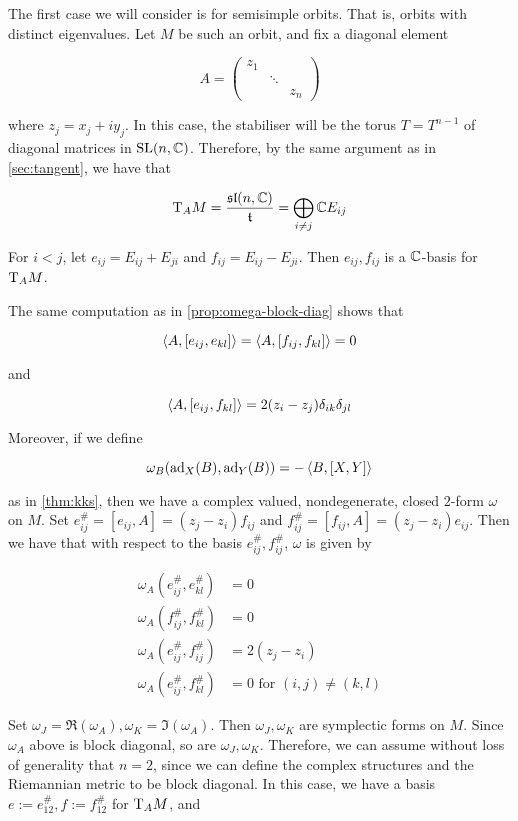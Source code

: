\documentclass{article}
\renewcommand{\sl}{\mathfrak{sl}}
\begin{document}
The first case we will consider is for semisimple orbits. That is, orbits with distinct eigenvalues. Let \(M\) be such an orbit, and fix a diagonal element

\[A = \begin{pmatrix}
    z_1 \\
    & \ddots \\
    & & z_n
\end{pmatrix}\]

where \(z_j = x_j + iy_j\). In this case, the stabiliser will be the torus \(T = T^{n-1}\) of diagonal matrices in \(\operatorname{SL}(n, \mathbb{C})\). Therefore, by the same argument as in \cref{sec:tangent}, we have that

\[\T_AM = \frac{\sl(n, \C)}{\mft} = \bigoplus_{i \ne j}\C E_{ij}\]

For \(i < j\), let \(e_{ij} = E_{ij} + E_{ji}\) and \(f_{ij} = E_{ij} - E_{ji}\). Then \(e_{ij}, f_{ij}\) is a \(\mathbb{C}\)-basis for \(\mathrm{T}_A M\).

The same computation as in \cref{prop:omega-block-diag} shows that

\[\left\langle A, [e_{ij}, e_{kl}] \right\rangle = \left\langle A, [f_{ij}, f_{kl}] \right\rangle = 0\]

and

\[\left\langle A, [e_{ij}, f_{kl}] \right\rangle = 2(z_i - z_j)\delta_{ik}\delta_{jl}\]

Moreover, if we define

\[\omega_B(\operatorname{ad}_X(B), \operatorname{ad}_Y(B)) = -\left\langle B, [X, Y] \right\rangle\]

as in \cref{thm:kks}, then we have a complex valued, nondegenerate, closed \(2\)-form \(\omega\) on \(M\). Set \(e_{ij}^\# = [e_{ij}, A] = (z_j - z_i)f_{ij}\) and \(f_{ij}^\# = [f_{ij}, A] = (z_j - z_i)e_{ij}\). Then we have that with respect to the basis \(e_{ij}^\#, f_{ij}^\#\), \(\omega\) is given by

\begin{align*}
    \omega_A(e_{ij}^\#, e_{kl}^\#) &= 0 \\
    \omega_A(f_{ij}^\#, f_{kl}^\#) &= 0 \\
    \omega_A(e_{ij}^\#, f_{ij}^\#) &= 2(z_j - z_i) \\
    \omega_A(e_{ij}^\#, f_{kl}^\#) &= 0 \text{ for }(i, j) \ne (k, l)
\end{align*}

Set \(\omega_J = \Re(\omega_A), \omega_K = \Im(\omega_A)\). Then \(\omega_J, \omega_K\) are symplectic forms on \(M\). Since \(\omega_A\) above is block diagonal, so are \(\omega_J, \omega_K\). Therefore, we can assume without loss of generality that \(n = 2\), since we can define the complex structures and the Riemannian metric to be block diagonal. In this case, we have a basis \(e := e_{12}^\#, f := f_{12}^\#\) for \(\mathrm{T}_AM\), and
\end{document}
